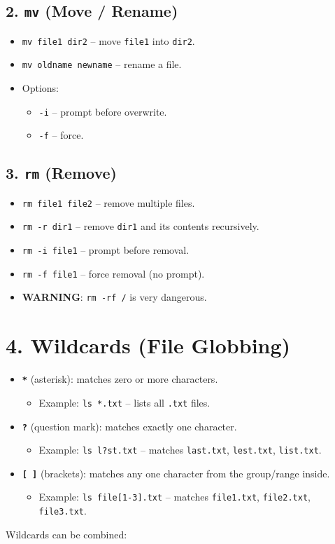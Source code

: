 \documentclass[a4paper]{report}
\begin{document}
\subsection*{2. \texttt{mv} (Move / Rename)}
\begin{itemize}
    \item \texttt{mv file1 dir2} -- move \texttt{file1} into \texttt{dir2}.
    \item \texttt{mv oldname newname} -- rename a file.
    \item Options:
    \begin{itemize}
        \item \texttt{-i} -- prompt before overwrite.
        \item \texttt{-f} -- force.
    \end{itemize}
\end{itemize}

\subsection*{3. \texttt{rm} (Remove)}
\begin{itemize}
    \item \texttt{rm file1 file2} -- remove multiple files.
    \item \texttt{rm -r dir1} -- remove \texttt{dir1} and its contents recursively.
    \item \texttt{rm -i file1} -- prompt before removal.
    \item \texttt{rm -f file1} -- force removal (no prompt).
    \item \textbf{WARNING}: \texttt{rm -rf /} is very dangerous.
\end{itemize}

\section*{4. Wildcards (File Globbing)}
\begin{itemize}
    \item \textbf{\texttt{*}} (asterisk): matches zero or more characters.
    \begin{itemize}
        \item Example: \texttt{ls *.txt} -- lists all \texttt{.txt} files.
    \end{itemize}
    \item \textbf{\texttt{?}} (question mark): matches exactly one character.
    \begin{itemize}
        \item Example: \texttt{ls l?st.txt} -- matches \texttt{last.txt}, \texttt{lest.txt}, \texttt{list.txt}.
    \end{itemize}
    \item \textbf{\texttt{[ ]}} (brackets): matches any one character from the group/range inside.
    \begin{itemize}
        \item Example: \texttt{ls file[1-3].txt} -- matches \texttt{file1.txt}, \texttt{file2.txt}, \texttt{file3.txt}.
    \end{itemize}
\end{itemize}
Wildcards can be combined:
\end{document}
